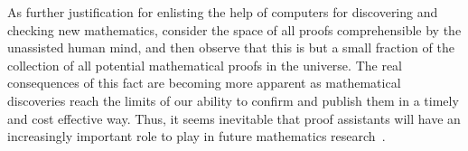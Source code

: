 \documentclass[11pt]{amsart}  %
\begin{document}

As further justification for enlisting the help of computers for discovering and checking new mathematics, consider the space of all proofs comprehensible by the unassisted human mind, and then observe that this is but a small fraction of the collection of all potential mathematical proofs in the universe. The real consequences of this fact are becoming more apparent as mathematical discoveries reach the limits of our ability to confirm and publish them in a timely and cost effective way. Thus, it seems inevitable that proof assistants will have an increasingly important role to play in future mathematics research~\cite{harris:2015}.


\end{document}
